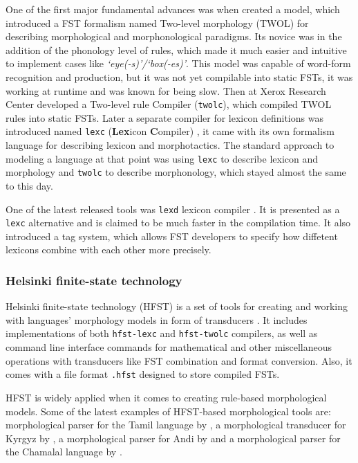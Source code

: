 One of the first major fundamental advances was when \parencite{koskenniemi_twol_1983} created a model, which introduced a FST formalism named Two-level morphology (TWOL) for describing morphological and morphonological paradigms. Its novice was in the addition of the phonology level of rules, which made it much easier and intuitive to implement cases like \textit{`eye(-s)'/`box(-es)'}. This model was capable of word-form recognition and production, but it was not yet compilable into static FSTs, it was working at runtime and was known for being slow. Then \textcite{karttunen_twolc_1987} at Xerox Research Center developed a Two-level rule Compiler (\texttt{twolc}), which compiled TWOL rules into static FSTs. Later a separate compiler for lexicon definitions was introduced named \texttt{lexc} (\textbf{Lex}icon \textbf{C}ompiler) \parencite{karttunen_lexc_1993}, it came with its own formalism language for describing lexicon and morphotactics. The standard approach to modeling a language at that point was using \texttt{lexc} to describe lexicon and morphology and \texttt{twolc} to describe morphonology, which stayed almost the same to this day. 

One of the latest released tools was \texttt{lexd} lexicon compiler \parencite{swanson_lexd_2021}. It is presented as a \texttt{lexc} alternative and is  claimed to be much faster in the compilation time. It also introduced a tag system, which allows FST developers to specify how diffetent lexicons combine with each other more precisely. 


\subsubsection{Helsinki finite-state technology}
Helsinki finite-state technology (HFST) is a set of tools for creating and working with languages' morphology models in form of transducers \parencite{linden_hfst_2009}. It includes implementations of both \texttt{hfst-lexc} and \texttt{hfst-twolc} compilers, as well as command line interface commands for mathematical and other miscellaneous operations with transducers like FST combination and format conversion. Also, it comes with a file format \texttt{.hfst} designed to store compiled FSTs.

HFST is widely applied when it comes to creating rule-based morphological models. Some of the latest examples of HFST-based morphological tools are: morphological parser for the Tamil language by \textcite{sarveswaran_morph_2021}, a morphological transducer for Kyrgyz by \textcite{washington_finite_2012}, a morphological parser for Andi by \textcite{buntyakova_2023_twol} and a morphological parser for the Chamalal language by \textcite{budilova_2023_twol}.

